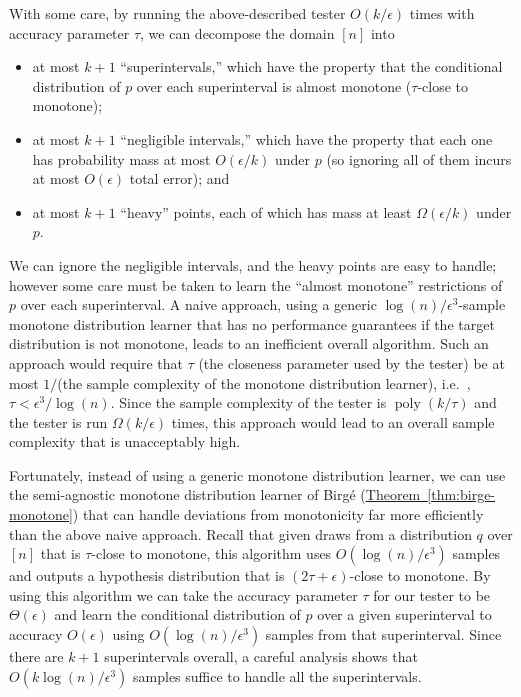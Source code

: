 \documentclass[10pt]{article}
\theoremstyle{definition}
\providecommand{\ie}{i.e.\ }
\numberwithin{equation}{section}
\newcommand{\expref}[2]{\texorpdfstring{\hyperref[#2]{#1~\ref{#2}}}{#1~\ref{#2}}}
\newcommand{\eps}{\epsilon}
\newcommand{\poly}{\operatorname{poly}}
\newcommand{\ignore}[1]{}
\begin{document}
With some care, by running the above-described tester $O(k/\eps)$ times with accuracy parameter $\tau$,
we can decompose the domain $[n]$ into

%

\begin{itemize}

\item at most $k+1$ ``superintervals,'' which have the property that the conditional distribution of
$p$ over each superinterval is almost monotone ($\tau$-close to monotone)\ignore{
};

%

\item at most $k+1$ ``negligible intervals,'' which have the property that each one has
probability mass at most $O(\eps/k)$ under $p$ (so ignoring all of them incurs at most $O(\eps)$ total
error); and

%

\item at most $k+1$ ``heavy'' points, each of which has mass at least $\Omega(\eps/k)$ under $p$.

\end{itemize}

%

\noindent
We can ignore the negligible intervals, and the heavy points are easy to handle; however some care must be taken to learn the ``almost monotone''
restrictions of $p$ over each superinterval.  A naive approach, using a generic
$\log(n)/\eps^3$-sample monotone distribution learner that has no performance guarantees if the target
distribution is not monotone, leads to an inefficient overall algorithm.  Such an approach
would require that $\tau$ (the closeness parameter used by the tester) be at most $1/$(the sample complexity
of the monotone distribution learner), \ie, $\tau < \eps^3/\log(n)$.  Since the sample
complexity of the tester is $\poly(k/\tau)$ and the tester is run $\Omega(k/\eps)$ times, this approach would lead
to an overall sample complexity that is unacceptably high.

Fortunately, instead of using a generic monotone distribution learner, we
can use the semi-agnostic monotone distribution learner of Birg\'{e}
(\expref{Theorem}{thm:birge-monotone}) that can handle
deviations from monotonicity far more efficiently than the above naive
approach.  Recall that given draws from a distribution
$q$ over $[n]$ that is $\tau$-close to monotone, this algorithm uses
$O(\log(n)/\eps^3)$ samples and outputs a hypothesis distribution that is
$(2\tau + \eps)$-close to monotone.  By using
this algorithm we can take the accuracy parameter $\tau$ for our tester to be $\Theta(\eps)$ and learn
the conditional distribution of $p$ over a given superinterval
to accuracy $O(\eps)$ using $O(\log(n)/\eps^3)$ samples from that
superinterval. Since there are $k+1$ superintervals overall, a careful analysis shows that
$O(k \log(n)/\eps^3)$ samples suffice to handle all the superintervals.
\end{document}
